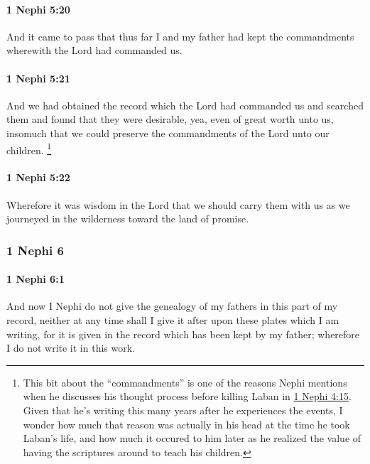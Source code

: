 		\paragraph{1 Nephi 5:20} %
			\label{1NEPHI-5-20}

			And it came to pass that thus far I and my father had kept the commandments
			wherewith the Lord had commanded us.

		\paragraph{1 Nephi 5:21} %
			\label{1NEPHI-5-21}

			And we had obtained the record which the Lord had commanded us
			and searched them and found that they were desirable,
			yea, even of great worth unto us,
			insomuch that we could preserve the commandments of the Lord unto our children.%
				\footnote{%
					\label{1NEPHI-5-21-NOTE-commandments}%
					This bit about the ``commandments'' is one of the reasons Nephi mentions when he discusses his thought process before killing Laban in \hyperref[1NEPHI-4-15]{1 Nephi 4:15}. Given that he's writing this many years after he experiences the events, I wonder how much that reason was actually in his head at the time he took Laban's life, and how much it occured to him later as he realized the value of having the scriptures around to teach his children.
					}

		\paragraph{1 Nephi 5:22} %
			\label{1NEPHI-5-22}

			Wherefore it was wisdom in the Lord that we should carry them with us
			as we journeyed in the wilderness toward the land of promise.
			
	\subsubsection{1 Nephi 6} %
		\label{1NEPHI-6}
		
		\paragraph{1 Nephi 6:1} %
			\label{1NEPHI-6-1}

			And now I Nephi do not give the genealogy of my fathers in this part of my record,
			neither at any time shall I give it after upon these plates which I am writing,
			for it is given in the record which has been kept by my father;
			wherefore I do not write it in this work.

